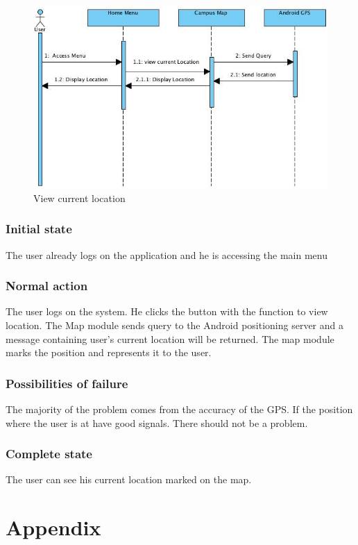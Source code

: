 \documentclass[10pt,a4paper,oneside]{report}
\begin{document}
\begin{figure}[H]
 \centering
 \includegraphics[keepaspectratio, scale=0.5]{seqfriend.png}
 \caption{View current location}
\end{figure}

\subsubsection*{Initial state}
The user already logs on the application and he is accessing the main menu
\subsubsection*{Normal action}
The user logs on the system. He clicks the button with the function to view location. The Map module sends query to the Android positioning server and a message containing user’s current location will be returned. The map module marks the position and represents it to the user.
\subsubsection*{Possibilities of failure}
The majority of the problem comes from the accuracy of the GPS. If the position where the user is at have good signals. There should not be a problem.
\subsubsection*{Complete state}
The user can see his current location marked on the map.

\section*{Appendix}



\end{document}
